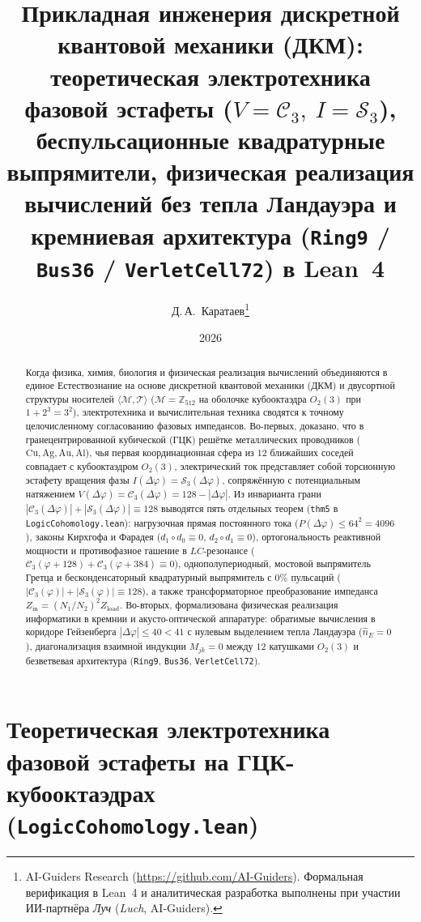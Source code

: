 \documentclass[11pt,a4paper]{article}
\title{\textbf{Прикладная инженерия дискретной квантовой механики (ДКМ):\\ теоретическая электротехника фазовой эстафеты ($V=\mathcal{C}_3,\ I=\mathcal{S}_3$), беспульсационные квадратурные выпрямители, физическая реализация вычислений без тепла Ландауэра и кремниевая архитектура (\texttt{Ring9} / \texttt{Bus36} / \texttt{VerletCell72}) в Lean~4}}
\author{Д.\,А.~Каратаев\thanks{AI-Guiders Research (\url{https://github.com/AI-Guiders}). Формальная верификация в Lean~4 и аналитическая разработка выполнены при участии ИИ-партнёра \emph{Луч} (\emph{Luch}, AI-Guiders).}}
\date{2026}
\theoremstyle{definition}
\theoremstyle{remark}
\begin{document}
\maketitle

\begin{abstract}
Когда физика, химия, биология и физическая реализация вычислений объединяются в единое Естествознание на основе дискретной квантовой механики (ДКМ) и двусортной структуры носителей $\langle\mathcal{M},\mathcal{T}\rangle$ ($\mathcal{M} = \mathbb{Z}_{512}$ на оболочке кубооктаэдра $O_2(3)$ при $1+2^3=3^2$), электротехника и вычислительная техника сводятся к точному целочисленному согласованию фазовых импедансов. Во-первых, доказано, что в гранецентрированной кубической (ГЦК) решётке металлических проводников ($\mathrm{Cu, Ag, Au, Al}$), чья первая координационная сфера из $12$ ближайших соседей совпадает с кубооктаэдром $O_2(3)$, электрический ток представляет собой торсионную эстафету вращения фазы $I(\Delta\varphi) = \mathcal{S}_3(\Delta\varphi)$, сопряжённую с потенциальным натяжением $V(\Delta\varphi) = \mathcal{C}_3(\Delta\varphi) = 128 - |\Delta\varphi|$. Из инварианта грани $|\mathcal{C}_3(\Delta\varphi)| + |\mathcal{S}_3(\Delta\varphi)| \equiv 128$ выводятся пять отдельных теорем (\texttt{thm5} в \texttt{LogicCohomology.lean}): нагрузочная прямая постоянного тока ($P(\Delta\varphi) \le 64^2 = 4096$), законы Кирхгофа и Фарадея ($d_1\circ d_0 \equiv 0$, $d_2\circ d_1 \equiv 0$), ортогональность реактивной мощности и противофазное гашение в $LC$-резонансе ($\mathcal{C}_3(\varphi+128) + \mathcal{C}_3(\varphi+384) \equiv 0$), однополупериодный, мостовой выпрямитель Гретца и бесконденсаторный квадратурный выпрямитель с $0\%$ пульсаций ($|\mathcal{C}_3(\varphi)| + |\mathcal{S}_3(\varphi)| \equiv 128$), а также трансформаторное преобразование импеданса $Z_{\mathrm{in}} = (N_1/N_2)^2 Z_{\mathrm{load}}$. Во-вторых, формализована физическая реализация информатики в кремнии и акусто-оптической аппаратуре: обратимые вычисления в коридоре Гейзенберга $|\Delta\varphi|\le 40 < 41$ с нулевым выделением тепла Ландауэра ($\hat{n}_E = 0$), диагонализация взаимной индукции $M_{jk} = 0$ между $12$ катушками $O_2(3)$ и безветвевая архитектура (\texttt{Ring9}, \texttt{Bus36}, \texttt{VerletCell72}).
\end{abstract}

\section{Теоретическая электротехника фазовой эстафеты на ГЦК-кубооктаэдрах (\texttt{LogicCohomology.lean})}
\label{sec:electrical-engineering}
\end{document}
